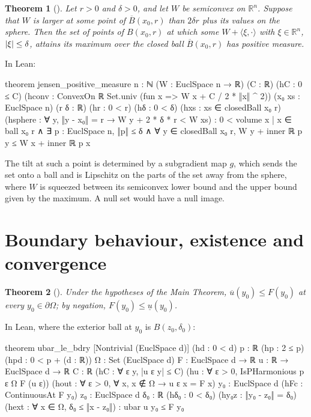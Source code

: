 \documentclass[11pt,reqno]{amsart}
\newcommand{\R}{\mathbb{R}}
\DeclarePairedDelimiter{\abs}{\lvert}{\rvert}
\theoremstyle{plain}
\newtheorem{theorem}{Theorem}[section]
\theoremstyle{definition}
\theoremstyle{remark}
\begin{document}
\begin{theorem}[]\label{thm:jensen}
Let $r>0$ and $\delta>0$, and let $W$ be semiconvex on $\R^n$.
Suppose that $W$ is larger at some point
of $\overline B(x_0, r)$ than $2\delta r$ plus its values on the sphere. Then
the set of points of $B(x_0,r)$ at which some $W + \langle \xi, \cdot\rangle$
with $\xi \in \R^n$, $\abs \xi \le \delta$, attains its maximum over the
closed ball $\overline B(x_0,r)$ has positive measure.
\end{theorem}

\begin{samepage}
\noindent In Lean:
\begin{lean}
theorem jensen_positive_measure {n : ℕ} (W : EuclSpace n → ℝ) (C : ℝ)
    (hC : 0 ≤ C) (hconv : ConvexOn ℝ Set.univ (fun x => W x + C / 2 * ‖x‖ ^ 2))
    (x₀ xs : EuclSpace n) (r δ : ℝ) (hr : 0 < r) (hδ : 0 < δ)
    (hxs : xs ∈ closedBall x₀ r)
    (hsphere : ∀ y, ‖y - x₀‖ = r → W y + 2 * δ * r < W xs) :
    0 < volume {x | x ∈ ball x₀ r ∧ ∃ p : EuclSpace n, ‖p‖ ≤ δ ∧
      ∀ y ∈ closedBall x₀ r, W y + inner ℝ p y ≤ W x + inner ℝ p x}
\end{lean}
\end{samepage}

The tilt at such a point is determined by a subgradient map $g$, which sends
the set onto a ball and is Lipschitz on the parts of the set away from the
sphere, where $W$ is squeezed between its semiconvex lower bound and the upper
bound given by the maximum. A null set would have a null image.

\section{Boundary behaviour, existence and convergence}\label{sec:boundary}

\begin{theorem}[]\label{thm:B}
Under the hypotheses of the Main Theorem, $\overline u(y_0) \le F(y_0)$ at
every $y_0 \in \partial\Omega$; by negation, $F(y_0) \le \underline u(y_0)$.
\end{theorem}

\noindent In Lean, where the exterior ball at $y_0$ is $B(z_0, \delta_0)$:
\begin{lean}
theorem ubar_le_bdry [Nontrivial (EuclSpace d)] (hd : 0 < d) {p : ℝ} (hp : 2 ≤ p)
    (hpd : 0 < p + (d : ℝ)) {Ω : Set (EuclSpace d)} {F : EuclSpace d → ℝ}
    {u : ℝ → EuclSpace d → ℝ} {C : ℝ} (hC : ∀ ε y, |u ε y| ≤ C)
    (hu : ∀ ε > 0, IsPHarmonious p ε Ω F (u ε))
    (hout : ∀ ε > 0, ∀ x, x ∉ Ω → u ε x = F x)
    {y₀ : EuclSpace d} (hFc : ContinuousAt F y₀)
    {z₀ : EuclSpace d} {δ₀ : ℝ} (hδ₀ : 0 < δ₀) (hy₀z : ‖y₀ - z₀‖ = δ₀)
    (hext : ∀ x ∈ Ω, δ₀ ≤ ‖x - z₀‖) :
    ubar u y₀ ≤ F y₀
\end{lean}
\end{document}
